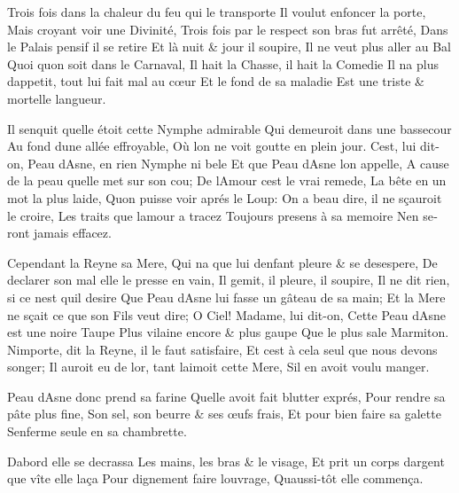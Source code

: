 \documentclass[14pt,a4paper]{memoir}
\begin{document}
\begin{otherlanguage}{french}
{Trois fois dans la chaleur du feu qui le transporte} {Il voulut
enfoncer la porte,} {Mais croyant voir une Divinité,} {Trois fois par le
respect son bras fut arrêté,} {Dans le Palais pensif il se retire} {Et
là nuit \& jour il soupire,} {Il ne veut plus aller au Bal} {Quoi
qu\textquotesingle on soit dans le Carnaval,} {Il hait la Chasse, il
hait la Comedie} {Il n\textquotesingle a plus d\textquotesingle appetit,
tout lui fait mal au cœur} {Et le fond de sa maladie} { Est une triste
\& mortelle langueur.}

{Il s\textquotesingle enquit quelle étoit cette Nymphe admirable } {Qui
demeuroit dans une bassecour} {Au fond d\textquotesingle une allée
effroyable,} {Où l\textquotesingle on ne voit goutte en plein jour.}
{C\textquotesingle est, lui dit-on, Peau d\textquotesingle Asne, en rien
Nymphe ni bele} {Et que Peau d\textquotesingle Asne l\textquotesingle on
appelle,} {A cause de la peau qu\textquotesingle elle met sur son cou;}
{De l\textquotesingle Amour c\textquotesingle est le vrai remede,} {La
bête en un mot la plus laide,} {Qu\textquotesingle on puisse voir aprés
le Loup:} {On a beau dire, il ne sçauroit le croire,} {Les traits que
l\textquotesingle amour a tracez} {Toujours presens à sa memoire}
{N\textquotesingle en seront jamais effacez.}

{Cependant la Reyne sa Mere,} {Qui n\textquotesingle a que lui
d\textquotesingle enfant pleure \& se desespere,} {De declarer son mal
elle le presse en vain,} {Il gemit, il pleure, il soupire,} {Il ne dit
rien, si ce n\textquotesingle est qu\textquotesingle il desire} {Que
Peau d\textquotesingle Asne lui fasse un gâteau de sa main; } {Et la
Mere ne sçait ce que son Fils veut dire;} {O Ciel! Madame, lui dit-on,}
{Cette Peau d\textquotesingle Asne est une noire Taupe} {Plus vilaine
encore \& plus gaupe} {Que le plus sale Marmiton.}
{N\textquotesingle importe, dit la Reyne, il le faut satisfaire, } {Et
c\textquotesingle est à cela seul que nous devons songer;} {Il auroit eu
de l\textquotesingle or, tant l\textquotesingle aimoit cette Mere, }
{S\textquotesingle il en avoit voulu manger.}

{Peau d\textquotesingle Asne donc prend sa farine}
{Qu\textquotesingle elle avoit fait blutter exprés,} {Pour rendre sa
pâte plus fine,} {Son sel, son beurre \& ses œufs frais, } {Et pour bien
faire sa galette} {S\textquotesingle enferme seule en sa chambrette.}

{D\textquotesingle abord elle se decrassa} {Les mains, les bras \& le
visage,} {Et prit un corps d\textquotesingle argent que vîte elle laça}
{Pour dignement faire l\textquotesingle ouvrage,}
{Qu\textquotesingle aussi-tôt elle commença.}


\end{otherlanguage}
\end{document}
